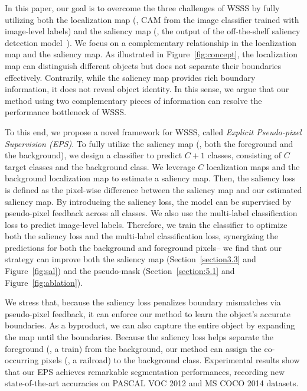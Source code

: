 \documentclass[final]{cvpr}
\begin{document}
In this paper, our goal is to overcome the three challenges of WSSS by fully utilizing both the localization map (\ie, CAM from the image classifier trained with image-level labels) and the saliency map (\ie, the output of the off-the-shelf saliency detection model~\cite{hou2017deeply,nguyen2019deepusps,zhao2019pyramid}). We focus on a complementary relationship in the localization map and the saliency map. As illustrated in Figure~\ref{fig:concept}, the localization map can distinguish different objects but does not separate their boundaries effectively. Contrarily, while the saliency map provides rich boundary information, it does not reveal object identity. In this sense, we argue that our method using two complementary pieces of information can resolve the performance bottleneck of WSSS.


To this end, we propose a novel framework for WSSS, called \emph{Explicit Pseudo-pixel Supervision (EPS)}. To fully utilize the saliency map (\ie, both the foreground and the background), we design a classifier to predict $C+1$ classes, consisting of $C$ target classes and the background class. We leverage $C$ localization maps and the background localization map to estimate a saliency map. Then, the saliency loss is defined as the pixel-wise difference between the saliency map and our estimated saliency map. By introducing the saliency loss, the model can be supervised by pseudo-pixel feedback across all classes. We also use the multi-label classification loss to predict image-level labels. Therefore, we train the classifier to optimize both the saliency loss and the multi-label classification loss, synergizing the predictions for both the background and foreground pixels-- we find that our strategy can improve both the saliency map (Section~\ref{section3.3} and Figure~\ref{fig:sal}) and the pseudo-mask (Section~\ref{section:5.1} and Figure~\ref{fig:ablation}). 


We stress that, because the saliency loss penalizes boundary mismatches via pseudo-pixel feedback, it can enforce our method to learn the object's accurate boundaries. As a byproduct, we can also capture the entire object by expanding the map until the boundaries. Because the saliency loss helps separate the foreground (\eg, a train) from the background, our method can assign the co-occurring pixels (\eg, a railroad) to the background class. Experimental results show that our EPS achieves remarkable segmentation performances, recording new state-of-the-art accuracies on PASCAL VOC 2012 and MS COCO 2014 datasets. 
\end{document}

